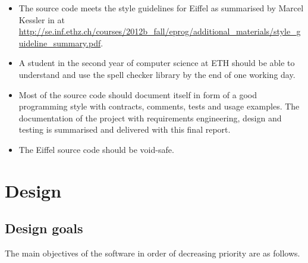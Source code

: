 \documentclass[paper=a4]{scrartcl}
\begin{document}
\begin{itemize}

\item The source code meets the style guidelines for Eiffel as summarised by Marcel Kessler in  at \url{http://se.inf.ethz.ch/courses/2012b_fall/eprog/additional_materials/style_guideline_summary.pdf}.

\item A student in the second year of computer science at ETH should be able to understand and use the spell checker library by the end of one working day.

\item Most of the source code should document itself in form of a good programming style with contracts, comments, tests and usage examples. The documentation of the project with requirements engineering, design and testing is summarised and delivered with this final report.

\item The Eiffel source code should be void-safe.

\end{itemize}







\section{Design}

\subsection{Design goals}

The main objectives of the software in order of decreasing priority are as follows.
\end{document}
